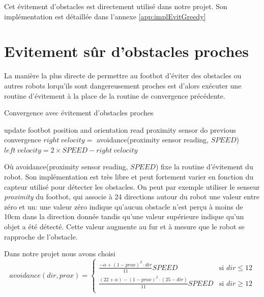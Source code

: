 Cet évitement d'obstacles est directement utilisé dans notre projet. Son implémentation est détaillée dans l'annexe \ref{app:implEvitGreedy}

\section{Evitement sûr d'obstacles proches\label{sec:emerAvoid}}

La manière la plus directe de permettre au footbot d'éviter des obstacles ou autres robots lorqu'ils sont dangereusement proches est d'alors exécuter une routine d'évitement à la place de la routine de convergence précédente.
\begin{algorithm}
\label{obstacleConvergence}
\caption{Convergence avec évitement d'obstacles proches}
\begin{algorithmic}
    \STATE update footbot position and orientation
    \STATE read proximity sensor 
      \STATE do previous convergence
    \ELSE
      \STATE \( right\:velocity = \) avoidance(proximity sensor reading, \(SPEED\))
    \ENDIF
    \STATE \( left\:velocity = 2 \times SPEED-right\:velocity\) 
  \ENDWHILE
\end{algorithmic}
\end{algorithm}

Où avoidance(proximity sensor reading, $SPEED$) fixe la routine d'évitement du robot. Son implémentation est très libre et peut fortement varier en fonction du capteur utilisé pour détecter les obstacles. On peut par exemple utiliser le senseur \emph{proximity} du footbot, qui associe à 24 directions autour du robot une valeur entre zéro et un: une valeur zéro indique qu'aucun obstacle n'est perçu à moins de 10cm dans la direction donnée tandis qu'une valeur supérieure indique qu'un objet a été détecté. Cette valeur augmente au fur et à mesure que le robot se rapproche de l'obstacle.~\cite{argosSite1}

Dans notre projet nous avons choisi
\[avoidance(dir, prox)=
  \begin{cases}
      \frac{-\alpha +(1-prox)^{\beta}\cdot dir}{11}SPEED & \text{si }dir \leq 12\\
      \frac{(22+\alpha )-(1-prox)^{\beta}\cdot (25-dir)}{11}SPEED & \text{si }dir \geq 12\\
  \end{cases}
\]

